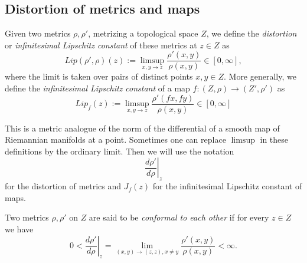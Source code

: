 \documentclass[12pt]{amsbook}%
\theoremstyle{definition}
\theoremstyle{remark}
\numberwithin{section}{chapter}
\numberwithin{subsection}{section}
\numberwithin{figure}{chapter}
\def\mini{\scriptsize}
\def\kap{}
\begin{document}
\subsection{Distortion of metrics and maps}\label{sec:Dilatation of metrics and maps}



Given two metrics $\rho, \rho'$, metrizing a topological space $Z$, we define the {\em distortion} or {\em infinitesimal Lipschitz constant} of these metrics at $z\in Z$ as 
\begin{equation}\label{eq:dilatation1}
Lip(\rho',\rho)(z) :=\limsup_{x, y\to z} \frac{\rho'(x, y)}{\rho(x, y)}\in [0,\infty],
\end{equation}
where the limit is taken over pairs of distinct points $x, y\in Z$. More generally, we define the {\em  infinitesimal Lipschitz constant}  of a map $f: (Z,\rho)\to (Z',\rho')$ as 
\begin{equation}\label{eq:dilatation2}
Lip_f(z):= \limsup_{x, y\to z} \frac{\rho'(f x, fy)}{\rho(x, y)}\in [0,\infty]
\end{equation}

This is a metric analogue of the norm of the differential of a smooth map of Riemannian manifolds at a point. Sometimes one can replace $\limsup$ in these definitions 
by the ordinary limit. Then we will use the notation 
$$
\left. \frac{d\rho'}{d\rho}\right\vert_z
$$
for the distortion of metrics and $J_f(z)$ for the  infinitesimal Lipschitz constant of maps. 

Two metrics $\rho, \rho'$ on $Z$ are said to be {\em conformal to each other} if for %
every $z\in Z$ we have 
$$
0< \left. \frac{d\rho'}{d\rho}\right\vert_z= \lim_{(x,y)\to (z,z), x\ne y} \frac{\rho'(x,y)}{\rho(x,y)}<\infty.   
$$ 



\end{document}
